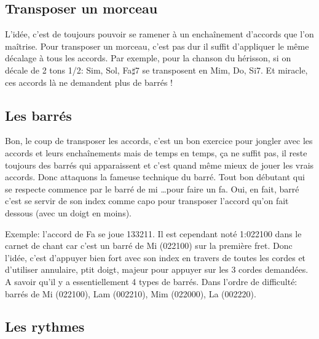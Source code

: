 \documentclass[a4paper,twoside]{article}
\begin{document}
\subsection{Transposer un morceau}

L'idée, c'est de toujours pouvoir se ramener à un enchaînement
d'accords que l'on maîtrise.  Pour transposer un morceau, c'est pas
dur il suffit d'appliquer le même décalage à tous les accords.  Par
exemple, pour la chanson du hérisson, si on décale de 2 tons 1/2: Sim,
Sol, Fa$\sharp$7 se transposent en Mim, Do, Si7.  Et miracle, ces
accords là ne demandent plus de barrés !

\subsection{Les barrés}

Bon, le coup de transposer les accords, c'est un bon exercice pour
jongler avec les accords et leurs enchaînements mais de temps en
temps, ça ne suffit pas, il reste toujours des barrés qui apparaissent
et c'est quand même mieux de jouer les vrais accords. Donc attaquons
la fameuse technique du barré. Tout bon débutant qui se respecte
commence par le barré de mi \dots pour faire un fa. Oui, en fait,
barré c'est se servir de son index comme capo pour transposer l'accord
qu'on fait dessous (avec un doigt en moins).

Exemple: l'accord de Fa se joue 133211. Il est cependant noté 1:022100
dans le carnet de chant car c'est un barré de Mi (022100) sur la
première fret.  Donc l'idée, c'est d'appuyer bien fort avec son index
en travers de toutes les cordes et d'utiliser annulaire, ptit doigt,
majeur pour appuyer sur les 3 cordes demandées. A savoir qu'il y a
essentiellement 4 types de barrés.  Dans l'ordre de difficulté: barrés
de Mi (022100), Lam (002210), Mim (022000), La (002220).

\subsection{Les rythmes}
\end{document}

